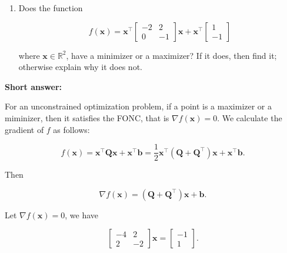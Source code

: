 \noindent
\begin{enumerate}
	\item Does the function

	\begin{equation*}
		f(\boldsymbol{x})=\boldsymbol{x}^{\top}\left[\begin{array}{cc}
			-2 & 2 \\
			0 & -1
		\end{array}\right] \boldsymbol{x}+\boldsymbol{x}^{\top}\left[\begin{array}{c}
			1 \\
			-1
		\end{array}\right]
	\end{equation*}
	
	where \(\boldsymbol{x} \in \mathbb{R}^{2}\), have a minimizer or a maximizer? If it does, then find it; otherwise explain why it does not.
\end{enumerate}

\textbf{Short answer:}

For an unconstrained optimization problem, if a point is a maximizer or a miminizer, then it satisfies the FONC, that is \(\nabla f(\boldsymbol{x})=0\). We calculate the gradient of \(f\) as follows:

\begin{equation*}
	f(\boldsymbol{x})=\boldsymbol{x}^{\top} \boldsymbol{Q} \boldsymbol{x}+\boldsymbol{x}^{\top} \boldsymbol{b}=\frac{1}{2} \boldsymbol{x}^{\top}\left(\boldsymbol{Q}+\boldsymbol{Q}^{\top}\right) \boldsymbol{x}+\boldsymbol{x}^{\top} \boldsymbol{b} .
\end{equation*}

Then

\begin{equation*}
	\nabla f(\boldsymbol{x})=\left(\boldsymbol{Q}+\boldsymbol{Q}^{\top}\right) \boldsymbol{x}+\boldsymbol{b}.
\end{equation*}

Let \(\nabla f(\boldsymbol{x})=0\), we have

\begin{equation*}
	\left[\begin{array}{cc}
		-4 & 2 \\
		2 & -2
	\end{array}\right] \boldsymbol{x}=\left[\begin{array}{c}
		-1 \\
		1
	\end{array}\right].
\end{equation*}

